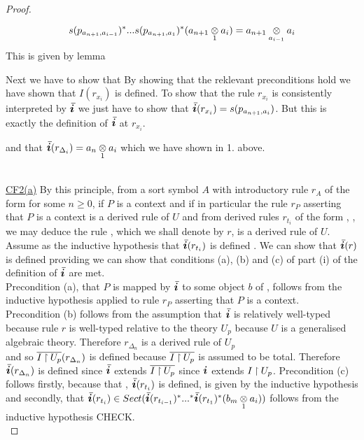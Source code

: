\begin{proof}
\begin{enumerate}
\begin{equation*}
s(p_{a_{n+1},a_{i-1}})^*...s(p_{a_{n+1},a_1})^*(a_{n+1} \underset{1}{\otimes} a_i) = a_{n+1} \underset{a_{i-1}}{\otimes} a_i
\end{equation*}  
This is given by lemma 
\end{enumerate}
Next we have to show that 
By showing that the reklevant preconditions hold we have shown that $I(r_{x_i})$ is defined. 
To show that the rule $r_{x_i}$ is consistently interpreted by $\Ibar$ we just have to show that
 $\Ibar(r_{x_i})=s(p_{a_{n+1},a_i})$. But this is exactly the definition of $\Ibar$ at $r_{x_i}$. 
\begin{newtt}and that $\Ibar(r_{\Delta_i})=\crossx{a_n}{a_i}{1}$ which we have shown in 1. above.\end{newtt} \\
\underline{CF2(a)}
By this principle, from a sort symbol $A$ with introductory rule $r_A$ of the form  for some $n \geq 0$, if
$P$ is a context and if in particular the rule $r_P$ asserting that $P$ is a context is a derived rule of $U$
and from derived rules $r_{t_i}$ of the form , \foreachi, we may deduce
the rule , which we shall denote by $r$, is a derived rule of $U$. \\

\noindent Assume as the inductive hypothesis that $\Ibar(r_{t_i})$ is defined \foreachi. We can show that $\Ibar(r)$ is defined providing we can show that conditions (a), (b) and (c) of part (i) of the definition of $\Ibar$ are met. \\
\noindent Precondition (a), that $P$ is mapped by $\Ibar$ to some object $b$  of \catc, follows from the inductive hypothesis applied to  rule $r_P$ asserting that $P$ is a context.  \\
\noindent Precondition (b) follows from the assumption that $\Ibar$ is relatively well-typed because rule $r$ is well-typed relative to the theory
$U_p$ because $U$ is a generalised algebraic theory. 
\noindent Therefore $r_{\Delta_n}$ is a derived rule of $U_p$\\ and so $\overline{I \mathbin{\restriction} U_p}(r_{\Delta_n})$ is defined  because $\overline{I \mathbin{\restriction} U_p}$ is assumed to be total. 
Therefore $\Ibar(r_{\Delta_n})$ is defined since
$\Ibar$ extends $\overline{I \mathbin{\restriction} U_p}$ since $\iI$ extends $I \mathbin{\restriction} U_p$. 
\noindent  Precondition (c) follows firstly, because that \foreachi, $\Ibar(r_{t_i})$ is defined, is given by the inductive hypothesis and 
secondly, that $\Ibar(r_{t_i}) \in Sect(\Ibar(r_{t_{i-1}})^*...^*\Ibar(r_{t_{1}})^*(\crossx{b_m}{a_i}{1}))$ follows  from 
the inductive hypothesis {CHECK}.\\


\end{proof}
